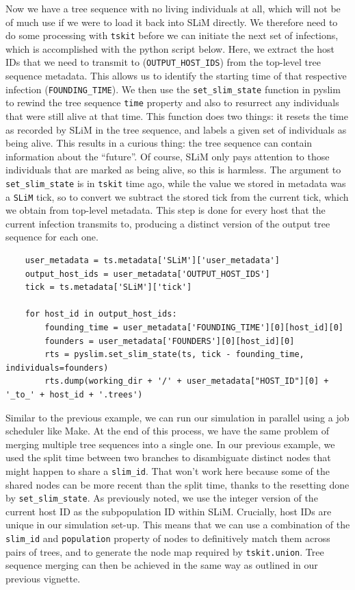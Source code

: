 \documentclass[12pt]{article}
\newcommand{\tskit}[0]{\texttt{tskit}\xspace}
\newcommand{\slim}[0]{\texttt{SLiM}\xspace}
\begin{document}
Now we have a tree sequence with no living individuals at all, which will not be of much use if we were to load it back into SLiM directly. We therefore need to do some processing
with \tskit before we can initiate the next set of infections, which is accomplished with the python script below. Here, we extract the host IDs that we need to transmit to (\verb|OUTPUT_HOST_IDS|)
from the top-level tree sequence metadata. This allows us to identify the starting time of that respective infection (\verb|FOUNDING_TIME|).
We then use the \verb|set_slim_state| function in pyslim to rewind
the tree sequence \verb|time| property and also to resurrect any individuals that were still alive at that time.
This function does two things: it resets the time as recorded by SLiM in the tree sequence,
and labels a given set of individuals as being alive.
This results in a curious thing: the tree sequence can contain information about the ``future''.
Of course, SLiM only pays attention to those individuals that are marked as being alive,
so this is harmless.
The argument to \verb|set_slim_state| is in \tskit time ago,
while the value we stored in metadata was a \slim tick,
so to convert we subtract the stored tick from the current tick,
which we obtain from top-level metadata.
This step is done for every host that the current infection transmits to, producing
a distinct version of the output tree sequence for each one.
\begin{verbatim}
    user_metadata = ts.metadata['SLiM']['user_metadata']
    output_host_ids = user_metadata['OUTPUT_HOST_IDS']
    tick = ts.metadata['SLiM']['tick']

    for host_id in output_host_ids:
        founding_time = user_metadata['FOUNDING_TIME'][0][host_id][0]
        founders = user_metadata['FOUNDERS'][0][host_id][0]
        rts = pyslim.set_slim_state(ts, tick - founding_time, individuals=founders)
        rts.dump(working_dir + '/' + user_metadata["HOST_ID"][0] + '_to_' + host_id + '.trees')
\end{verbatim}

Similar to the previous example, we can run our simulation in parallel using a job scheduler like Make. %
At the end of this process, we have the same problem of merging multiple tree sequences into a single one.
In our previous example, we used the split time between two branches
to disambiguate distinct nodes that might happen to share a \verb|slim_id|.
That won't work here because some of the shared nodes can be more recent than the split time,
thanks to the resetting done by \verb|set_slim_state|.
As previously noted, we use the integer version of the current host ID as the subpopulation ID within SLiM.
Crucially, host IDs are unique in our simulation set-up.
This means that we can use a combination of the \verb|slim_id| and \verb|population| property of nodes to
definitively match them across pairs of trees, and to generate the node map required by \verb|tskit.union|.
Tree sequence merging can then be achieved in the same way as outlined
in our previous vignette. %
\end{document}
